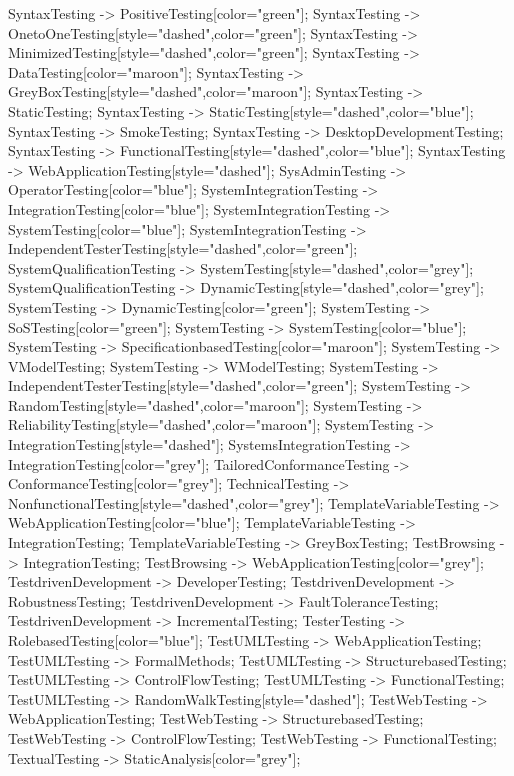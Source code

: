 \documentclass{article}
\begin{document}
{SyntaxTesting -> PositiveTesting[color="green"];
SyntaxTesting -> OnetoOneTesting[style="dashed",color="green"];
SyntaxTesting -> MinimizedTesting[style="dashed",color="green"];
SyntaxTesting -> DataTesting[color="maroon"];
SyntaxTesting -> GreyBoxTesting[style="dashed",color="maroon"];
SyntaxTesting -> StaticTesting;
SyntaxTesting -> StaticTesting[style="dashed",color="blue"];
SyntaxTesting -> SmokeTesting;
SyntaxTesting -> DesktopDevelopmentTesting;
SyntaxTesting -> FunctionalTesting[style="dashed",color="blue"];
SyntaxTesting -> WebApplicationTesting[style="dashed"];
SysAdminTesting -> OperatorTesting[color="blue"];
SystemIntegrationTesting -> IntegrationTesting[color="blue"];
SystemIntegrationTesting -> SystemTesting[color="blue"];
SystemIntegrationTesting -> IndependentTesterTesting[style="dashed",color="green"];
SystemQualificationTesting -> SystemTesting[style="dashed",color="grey"];
SystemQualificationTesting -> DynamicTesting[style="dashed",color="grey"];
SystemTesting -> DynamicTesting[color="green"];
SystemTesting -> SoSTesting[color="green"];
SystemTesting -> SystemTesting[color="blue"];
SystemTesting -> SpecificationbasedTesting[color="maroon"];
SystemTesting -> VModelTesting;
SystemTesting -> WModelTesting;
SystemTesting -> IndependentTesterTesting[style="dashed",color="green"];
SystemTesting -> RandomTesting[style="dashed",color="maroon"];
SystemTesting -> ReliabilityTesting[style="dashed",color="maroon"];
SystemTesting -> IntegrationTesting[style="dashed"];
SystemsIntegrationTesting -> IntegrationTesting[color="grey"];
TailoredConformanceTesting -> ConformanceTesting[color="grey"];
TechnicalTesting -> NonfunctionalTesting[style="dashed",color="grey"];
TemplateVariableTesting -> WebApplicationTesting[color="blue"];
TemplateVariableTesting -> IntegrationTesting;
TemplateVariableTesting -> GreyBoxTesting;
TestBrowsing -> IntegrationTesting;
TestBrowsing -> WebApplicationTesting[color="grey"];
TestdrivenDevelopment -> DeveloperTesting;
TestdrivenDevelopment -> RobustnessTesting;
TestdrivenDevelopment -> FaultToleranceTesting;
TestdrivenDevelopment -> IncrementalTesting;
TesterTesting -> RolebasedTesting[color="blue"];
TestUMLTesting -> WebApplicationTesting;
TestUMLTesting -> FormalMethods;
TestUMLTesting -> StructurebasedTesting;
TestUMLTesting -> ControlFlowTesting;
TestUMLTesting -> FunctionalTesting;
TestUMLTesting -> RandomWalkTesting[style="dashed"];
TestWebTesting -> WebApplicationTesting;
TestWebTesting -> StructurebasedTesting;
TestWebTesting -> ControlFlowTesting;
TestWebTesting -> FunctionalTesting;
TextualTesting -> StaticAnalysis[color="grey"];
}
\end{document}
